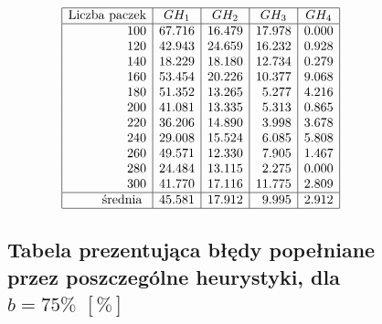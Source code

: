 \documentclass[polish,polish,a4paper]{article}
\begin{document}
\begin{spacing}{1.35}
\begin{figure}[H]
\begin{spacing}{1.7}
	\begin{equation*}
	\begin{array}{|r|r|r|r|r|}
	\hline
\multicolumn{1}{|c|}{$Liczba paczek$}&\multicolumn{1}{c|}{GH_{1}}&\multicolumn{1}{c|}{GH_{2}}&\multicolumn{1}{c|}{GH_{3}}&\multicolumn{1}{c|}{GH_{4}}\\\hline
	100&67.716&16.479&17.978&0.000\\ 
	120&42.943&24.659&16.232&0.928\\ 
	140&18.229&18.180&12.734&0.279\\ 
	160&53.454&20.226&10.377&9.068\\ 
	180&51.352&13.265&5.277&4.216\\ 
	200&41.081&13.335&5.313&0.865\\ 
	220&36.206&14.890&3.998&3.678\\ 
	240&29.008&15.524&6.085&5.808\\ 
	260&49.571&12.330&7.905&1.467\\ 
	280&24.484&13.115&2.275&0.000\\ 
	300&41.770&17.116&11.775&2.809\\ 
	\hline
	$ średnia $&45.581&17.912&9.995&2.912\\ \hline
	\end{array}
	\end{equation*}
\end{spacing}
\end{figure}


\begin{figure}[H]
			{\centering
		\subsection*{Tabela prezentująca błędy popełniane przez poszczególne heurystyki, dla $b = 75 \%$ $ [\%] $
	}}
	\begin{spacing}{1.7}


\end{spacing}
\end{figure}
\end{spacing}
\end{document}
